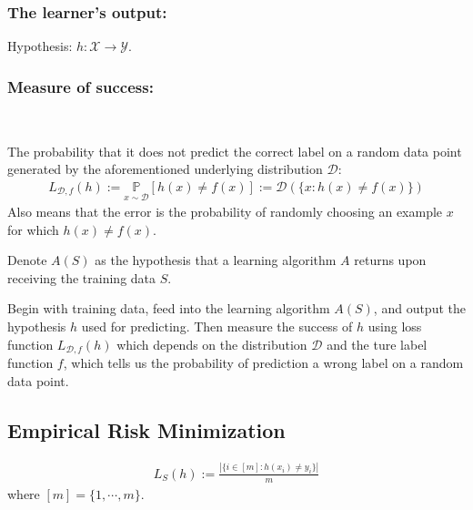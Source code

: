\subsubsection{The learner's output:}
\begin{definition}[Hypothesis]
Hypothesis: $h: \mathcal{X} \to \mathcal{Y}$.
\end{definition}

\subsubsection{Measure of success:}
\begin{definition} ~

The probability that it does not predict the correct label on a random data point generated by the aforementioned underlying distribution $\mathcal{D}$:
\begin{align*}
    L_{\mathcal{D}, f}(h) := \underset{x \sim \mathcal{D}}{\mathbb{P}} [h(x) \neq f(x)] := \mathcal{D}(\{ x: h(x) \neq f(x) \})
\end{align*}
Also means that the error is the probability of randomly choosing an example $x$ for which $h(x)\neq f(x)$.
\end{definition}

\begin{notation}
    Denote $A(S)$ as the hypothesis that a learning algorithm $A$ returns upon receiving the training data $S$.
\end{notation}

\begin{summary}
    Begin with training data, feed into the learning algorithm $A(S)$, and output the hypothesis $h$ used for predicting. Then measure the success of $h$ using loss function $L_{\mathcal{D}, f}(h)$ which depends on the distribution $\mathcal{D}$ and the ture label function $f$, which tells us the probability of prediction a wrong label on a random data point.
\end{summary}

\subsection{Empirical Risk Minimization} \label{sec:}
\begin{definition}
    \begin{align*}
        L_S(h) := \frac{|\{ i \in [m] : h(x_i) \neq  y_i \}|}{m}
    \end{align*}
    where $[m] = \{  1, \cdots , m \}$.
\end{definition}

